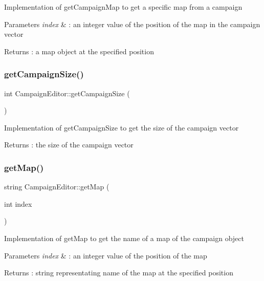 Implementation of get\+Campaign\+Map to get a specific map from a campaign 
\begin{DoxyParams}{Parameters}
{\em index} & \+: an integer value of the position of the map in the campaign vector \\
\hline
\end{DoxyParams}
\begin{DoxyReturn}{Returns}
\+: a map object at the specified position 
\end{DoxyReturn}
\hypertarget{class_campaign_editor_afa6ea5f195b60ff60ceba7625e417613}{}\label{class_campaign_editor_afa6ea5f195b60ff60ceba7625e417613} 
\subsubsection{\texorpdfstring{get\+Campaign\+Size()}{getCampaignSize()}}
{\footnotesize\ttfamily int Campaign\+Editor\+::get\+Campaign\+Size (\begin{DoxyParamCaption}{ }\end{DoxyParamCaption})}

Implementation of get\+Campaign\+Size to get the size of the campaign vector \begin{DoxyReturn}{Returns}
\+: the size of the campaign vector 
\end{DoxyReturn}
\hypertarget{class_campaign_editor_a032797d696d1ef3e092756ea3fb6a8e8}{}\label{class_campaign_editor_a032797d696d1ef3e092756ea3fb6a8e8} 
\subsubsection{\texorpdfstring{get\+Map()}{getMap()}}
{\footnotesize\ttfamily string Campaign\+Editor\+::get\+Map (\begin{DoxyParamCaption}\item[{int}]{index }\end{DoxyParamCaption})}

Implementation of get\+Map to get the name of a map of the campaign object 
\begin{DoxyParams}{Parameters}
{\em index} & \+: an integer value of the position of the map \\
\hline
\end{DoxyParams}
\begin{DoxyReturn}{Returns}
\+: string representating name of the map at the specified position 
\end{DoxyReturn}
\hypertarget{class_campaign_editor_ad27545a0bba9e86e5b03d20ca6e8d828}{}\label{class_campaign_editor_ad27545a0bba9e86e5b03d20ca6e8d828} 
